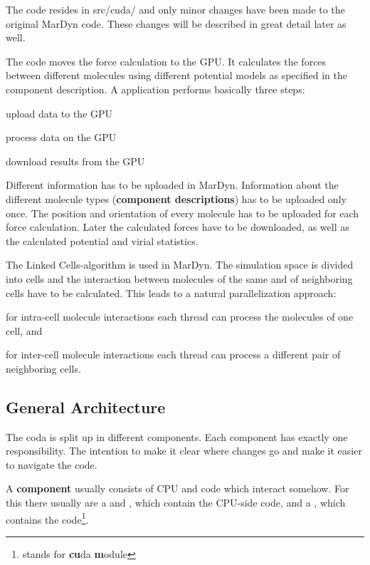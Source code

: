 The code resides in src/cuda/ and only minor changes have been made to the original MarDyn code. These changes will be described in great detail later as well.

The \cuda{} code moves the force calculation to the GPU. It calculates the forces between different molecules using different potential models as specified in the component description.
A \cuda{} application performs basically three steps:
\begin{compactenum}
\item upload data to the GPU
\item process data on the GPU
\item download results from the GPU
\end{compactenum} 
Different information has to be uploaded in MarDyn. Information about the different molecule types (\textbf{component descriptions}) has to be uploaded only once. The position and orientation of every molecule has to be uploaded for each force calculation. 
Later the calculated forces have to be downloaded, as well as the calculated potential and virial statistics.

The Linked Cells-algorithm is used in MarDyn. The simulation space is divided into cells and the interaction between molecules of the same and of neighboring cells have to be calculated.
This leads to a natural parallelization approach:
\begin{compactitem}
\item for intra-cell molecule interactions each thread can process the molecules of one cell, and
\item for inter-cell molecule interactions each thread can process a different pair of neighboring cells.
\end{compactitem}

\subsection{General Architecture}
The \cuda{} coda is split up in different components. Each component has exactly one responsibility.
The intention to make it clear where changes go and make it easier to navigate the code.

A \textbf{component} usually consists of CPU and \cuda{} code which interact somehow. For this there usually are a  and , which contain the CPU-side code, and a , which contains the \cuda{} code\footnote{ stands for \textbf{cu}da \textbf{m}odule}.

